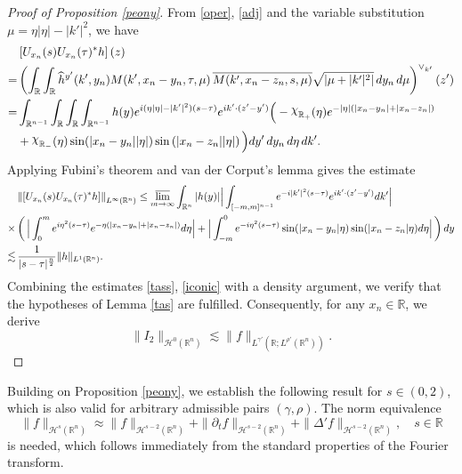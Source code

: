 \documentclass[preprint,compress,12pt]{elsarticle}
\numberwithin{equation}{section}
\begin{document}
\begin{proof}[Proof of Proposition \ref{peony}]
	From \eqref{oper}, \eqref{adj} and  the variable substitution $\mu=\eta|\eta|-|k'|^{2}$, we have
	\begin{equation*}
		\begin{aligned}
			&\left[U_{x_{n}}(s)U_{x_{n}}(\tau)^{*}h\right](z)\\
			=  & \left(\int_{\mathbb{R}}\int_{\mathbb{R}}   \widehat{h}^{y'}(k',y_{n}) M(k',x_{n}-y_{n},\tau,\mu)\,  \overline{M(k',x_{n}-z_{n},s,\mu)}\sqrt{\left|\mu+|k'|^{2}\right|} \,dy_{n}\,d\mu\right)^{\vee_{k'}}(z')\\
			=&\int_{\mathbb{R}^{n-1}}\int_{\mathbb{R}}\int_{\mathbb{R}}\int_{\mathbb{R}^{n-1}}h(y) e^{i(\eta|\eta|-|k'|^{2})(s-\tau)} e^{ik'\cdot(z'-y')}  \Big(-\raisebox{0.5ex}{$\chi$}_{\mathbb{R}_{+}}(\eta)e^{-|\eta|\left(|x_{n}-y_{n}|+|x_{n}-z_{n}|\right)}\\
			&+\raisebox{0.5ex}{$\chi$}_{\mathbb{R}_{-}}(\eta)\sin(|x_{n}-y_{n}||\eta|) \sin\left(|x_{n}-z_{n}||\eta|\right)\Big) dy'\,dy_{n}\,d\eta\,dk'.
		\end{aligned}
	\end{equation*}
	Applying Fubini's theorem and van der Corput's lemma \cite{mat} gives the estimate
	{\small		\begin{equation}\label{iconic}
			\begin{aligned} &\left\|[U_{x_{n}}(s)U_{x_{n}}(\tau)^{*}h]\right\|_{L^{\infty}(\mathbb{R}^{n})}
				\leq  \varlimsup_{m\rightarrow\infty}\int_{\mathbb{R}^{n}}|h(y)|\Big|\int_{[-m,m]^{n-1}}e^{-i|k'|^{2}(s-\tau)} e^{ik'\cdot(z'-y')}dk'\Big|\\
				\times&\left(\,\Big|\int_{0}^{m}e^{i\eta^{2}(s-\tau)} e^{-\eta\left(|x_{n}-y_{n}|+|x_{n}-z_{n}|\right)} d\eta\Big|
				+\Big|\int_{-m}^{0}e^{-i\eta^{2}(s-\tau)}\sin(|x_{n}-y_{n}|\eta)\sin(|x_{n}-z_{n}|\eta)d\eta\Big|\,\right)dy\\
				\lesssim &\,
				\frac{1}{|s-\tau|^{\frac{n}{2}}}\|h\|_{L^{1}(\mathbb{R}^{n})}.
			\end{aligned}
	\end{equation}}
	Combining the estimates \eqref{tass}, \eqref{iconic} with a density argument, we verify that the hypotheses of Lemma \ref{tas} are fulfilled. Consequently, for any $x_{n}\in\mathbb{R}$, we derive
	\begin{equation}
		\|I_{2}\|_{\mathcal{H}^{0}(\mathbb{R}^{n})}\lesssim \|f\|_{L^{\gamma'}(\mathbb{R};L^{\rho'}(\mathbb{R}^{n}))}.
	\end{equation}
\end{proof}

Building on Proposition \ref{peony}, we establish the following result for $s\in(0,2)$, which is also valid for arbitrary admissible pairs $(\gamma,\rho)$. The norm equivalence
\begin{equation}\label{shenjing}			\|f\|_{\mathcal{H}^{s}(\mathbb{R}^{n})}\approx\|f\|_{\mathcal{H}^{s-2}(\mathbb{R}^{n})}+\|\partial_{t}f\|_{\mathcal{H}^{s-2}(\mathbb{R}^{n})}+\|\Delta'f\|_{\mathcal{H}^{s-2}(\mathbb{R}^{n})},\quad s\in \mathbb{R}
\end{equation}
 is needed, which follows immediately from the standard properties of the Fourier transform.
\end{document}

